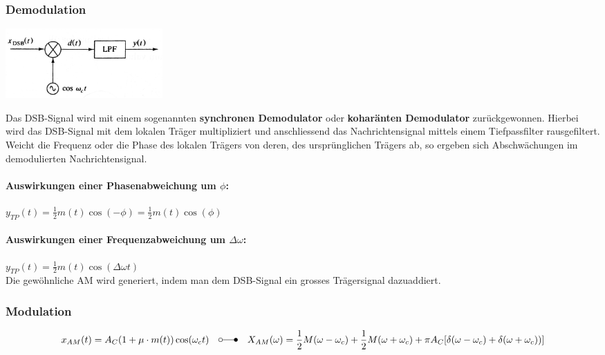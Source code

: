 \subsubsection{Demodulation} 
\label{am_dsb_modulation}
\begin{minipage}[t][2.3cm][c]{6.5cm}
    \includegraphics[width=6cm]{bilder/am_dsb_demodulation.png}
\end{minipage}
\begin{minipage}[t][2.3cm][c]{11.5cm}
	Das DSB-Signal wird mit einem sogenannten \textbf{synchronen Demodulator} oder \textbf{koharänten
	Demodulator} zurückgewonnen. Hierbei wird das DSB-Signal mit dem lokalen Träger
	multipliziert und anschliessend das Nachrichtensignal mittels einem Tiefpassfilter rausgefiltert.
	\\ Weicht die Frequenz oder die Phase des lokalen Trägers von deren, des ursprünglichen Trägers ab, 
	so ergeben sich Abschwächungen im demodulierten Nachrichtensignal.
\end{minipage}

\paragraph{Auswirkungen einer Phasenabweichung um $\phi$:} $y_{TP}(t) = \frac{1}{2}
m(t) \cos(-\phi)= \frac{1}{2} m(t) \cos(\phi) $
\paragraph{Auswirkungen einer Frequenzabweichung um $\Delta \omega$:} $y_{TP}(t) =
\frac{1}{2} m(t) \cos(\Delta \omega t)$\\



Die gewöhnliche AM wird generiert, indem man dem DSB-Signal ein grosses Trägersignal dazuaddiert.

\subsubsection{Modulation}

$$x_{AM}(t) = A_C (1 + \mu \cdot m(t)) \cos(\omega_c t)
	\quad \laplace \quad X_{AM}(\omega) = \frac{1}{2}M(\omega - \omega_c) + \frac{1}{2}M(\omega + \omega_c)
	+ \pi A_C [\delta (\omega - \omega_c) + \delta (\omega + \omega_c))]$$


